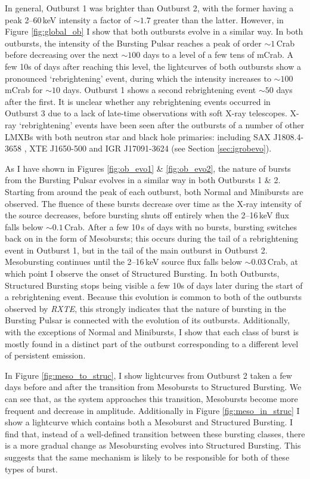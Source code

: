 \par In general, Outburst 1 was brighter than Outburst 2, with the former having a peak 2--60\,keV intensity a factor of $\sim1.7$ greater than the latter.  However, in Figure \ref{fig:global_ob} I show that both outbursts evolve in a similar way.  In both outbursts, the intensity of the Bursting Pulsar reaches a peak of order $\sim1$\,Crab before decreasing over the next $\sim100$ days to a level of a few tens of mCrab.  A few 10s of days after reaching this level, the lightcurves of both outbursts show a pronounced `rebrightening' event, during which the intensity increases to $\sim100$\,mCrab for $\sim10$ days.  Outburst 1 shows a second rebrightening event $\sim50$ days after the first.  It is unclear whether any rebrightening events occurred in Outburst 3 due to a lack of late-time observations with soft X-ray telescopes.  X-ray `rebrightening' events have been seen after the outbursts of a number of other LMXBs with both neutron star and black hole primaries: including SAX J1808.4-3658 \citep{Wijnands_1808}, XTE J1650-500 \citep{Tomsick_MiniOutbursts} and IGR J17091-3624 (see Section \ref{sec:igrobevo}).
\par As I have shown in Figures \ref{fig:ob_evo1} \& \ref{fig:ob_evo2}, the nature of bursts from the Bursting Pulsar evolves in a similar way in both Outbursts 1 \& 2.  Starting from around the peak of each outburst, both Normal and Minibursts are observed.  The fluence of these bursts decrease over time as the X-ray intensity of the source decreases, before bursting shuts off entirely when the 2--16\,keV flux falls below $\sim0.1$\,Crab.  After a few 10\,s of days with no bursts, bursting switches back on in the form of Mesobursts; this occurs during the tail of a rebrightening event in Outburst 1, but in the tail of the main outburst in Outburst 2.  Mesobursting continues until the 2--16\,keV source flux falls below $\sim0.03$\,Crab, at which point I observe the onset of Structured Bursting.  In both Outbursts, Structured Bursting stops being visible a few 10s of days later during the start of a rebrightening event.  Because this evolution is common to both of the outbursts observed by \textit{RXTE}, this strongly indicates that the nature of bursting in the Bursting Pulsar is connected with the evolution of its outbursts.  Additionally, with the exceptions of Normal and Minibursts, I show that each class of burst is mostly found in a distinct part of the outburst corresponding to a different level of persistent emission.
\par In Figure \ref{fig:meso_to_struc}, I show lightcurves from Outburst 2 taken a few days before and after the transition from Mesobursts to Structured Bursting.  We can see that, as the system approaches this transition, Mesobursts become more frequent and decrease in amplitude.  Additionally in Figure \ref{fig:meso_in_struc} I show a lightcurve which contains both a Mesoburst and Structured Bursting.  I find that, instead of a well-defined transition between these bursting classes, there is a more gradual change as Mesobursting evolves into Structured Bursting.  This suggests that the same mechanism is likely to be responsible for both of these types of burst.

